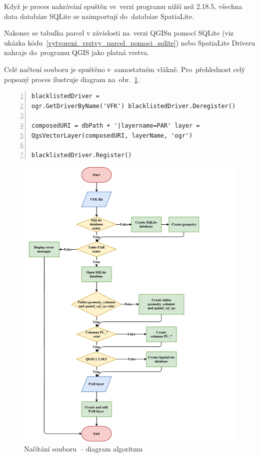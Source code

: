 Když je proces nahrávání spuštěn ve~verzi programu nižší než 2.18.5,
všechna data databáze SQLite se naimportují do~databáze SpatiaLite.

Nakonec se tabulka parcel v závislosti na~verzi QGISu pomocí SQLite
(viz ukázka kódu~\ref{vytvoreni_vrstvy_parcel_pomoci_sqlite}) nebo
SpatiaLite Driveru nahraje do~programu QGIS jako platná vrstva.

Celé načtení  souboru je spuštěno v~samostatném
vlákně. Pro~přehlednost celý popsaný proces ilustruje diagram
na~obr.~\ref{fig:diagram_nacitani_vfk}.

{\scriptsize
\begin{lstlisting}[style=python, caption={Vytvoření QGIS vrstvy parcel
pomocí SQLite Driveru}, captionpos=b,
label=vytvoreni_vrstvy_parcel_pomoci_sqlite, backgroundcolor =
\color{light-gray}, numbers=left] blacklistedDriver =
ogr.GetDriverByName('VFK') blacklistedDriver.Deregister()

composedURI = dbPath + '|layername=PAR' layer =
QgsVectorLayer(composedURI, layerName, 'ogr')
	
blacklistedDriver.Register()
\end{lstlisting}}

	\begin{figure}[H] \centering
		\includegraphics[width=1.2\textwidth]{./pictures/nacitani_vfk_souboru.pdf}
		\caption[Načítání  souboru~– diagram
algoritmu]{Načítání  souboru~– diagram algoritmu}
		\label{fig:diagram_nacitani_vfk}
 	\end{figure}

